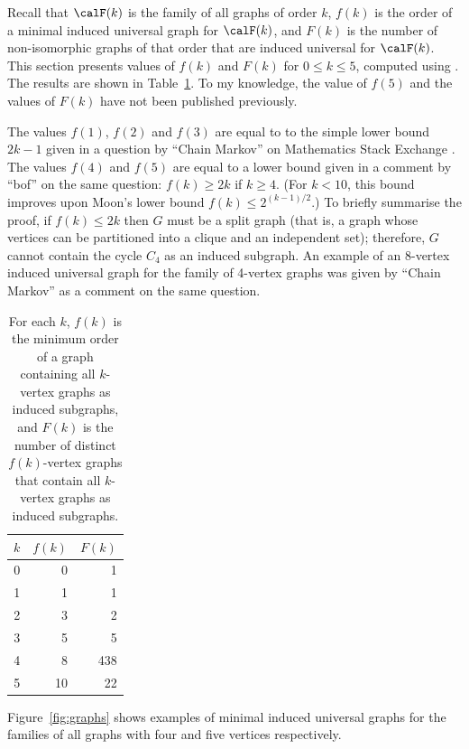 Recall that $\calF(k)$ is the family of all graphs of order $k$, $f(k)$ is
the order of a minimal induced universal graph for
$\calF(k)$, and $F(k)$ is the number of non-isomorphic graphs of that order
that are induced universal for $\calF(k)$.  This section
presents values of $f(k)$ and $F(k)$ for $0 \leq k \leq 5$, computed
using . The results are shown in 
Table~\ref{tab:graphresults}.  To my knowledge, the value of
$f(5)$ and the values of $F(k)$ have not been published previously.

The values $f(1)$, $f(2)$ and $f(3)$ are equal to to the simple lower bound $2k
- 1$ given in a question by ``Chain Markov'' on Mathematics Stack Exchange
  \cite{math_se_question}.  The values $f(4)$ and $f(5)$ are equal to a lower
  bound given in a comment by ``bof'' on the same question: $f(k) \geq 2k$ if $k
  \geq 4$.  (For $k < 10$, this bound improves upon Moon's lower bound $f(k)
  \leq 2^{(k-1)/2}$.) To briefly summarise the proof, if $f(k) \leq 2k$ then $G$
  must be a split graph (that is, a graph whose vertices can be partitioned
  into a clique and an independent set); therefore, $G$ cannot contain the
  cycle $C_4$ as an induced subgraph.  An example of an 8-vertex induced
  universal graph for the family of 4-vertex graphs was given by ``Chain
  Markov'' as a comment on the same question.

\begin{table}[h!]
\centering
\begin{tabular}{r r r}
 \toprule
 $k$ & $f(k)$ & $F(k)$ \\ [0.5ex]
 \midrule
 0 & 0 & 1 \\
 1 & 1 & 1 \\
 2 & 3 & 2 \\
 3 & 5 & 5 \\
 4 & 8 & 438 \\
 5 & 10 & 22 \\
 \bottomrule
\end{tabular}
\caption{For each $k$, $f(k)$ is the minimum order of a graph containing all $k$-vertex graphs as
induced subgraphs, and $F(k)$ is the number of distinct $f(k)$-vertex graphs that contain
all $k$-vertex graphs as induced subgraphs.}
\label{tab:graphresults}
\end{table}
%
%

Figure~\ref{fig:graphs} shows examples of minimal induced universal graphs
for the families of all graphs with four and five vertices
respectively.


